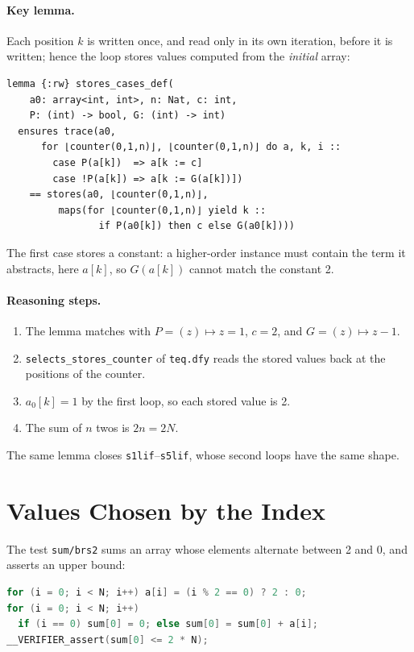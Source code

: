 \documentclass[sigconf,nonacm]{acmart}
\newcommand{\code}[1]{\texttt{#1}}
\begin{document}
\paragraph{Key lemma.} Each position $k$ is written once, and read only in
its own iteration, before it is written; hence the loop stores values computed
from the \emph{initial} array:
\begin{lstlisting}[language=dafny]
lemma {:rw} stores_cases_def(
    a0: array<int, int>, n: Nat, c: int,
    P: (int) -> bool, G: (int) -> int)
  ensures trace(a0,
      for ⌊counter(0,1,n)⌋, ⌊counter(0,1,n)⌋ do a, k, i ::
        case P(a[k])  => a[k := c]
        case !P(a[k]) => a[k := G(a[k])])
    == stores(a0, ⌊counter(0,1,n)⌋,
         maps(for ⌊counter(0,1,n)⌋ yield k ::
                if P(a0[k]) then c else G(a0[k])))
\end{lstlisting}
The first case stores a constant: a higher-order instance must contain the
term it abstracts, here $a[k]$, so $G(a[k])$ cannot match the constant 2.

\paragraph{Reasoning steps.}
\begin{enumerate}
\item The lemma matches with $P = (z) \mapsto z = 1$, $c = 2$, and
  $G = (z) \mapsto z - 1$.
\item \code{selects\_stores\_counter} of \code{teq.dfy} reads the stored
  values back at the positions of the counter.
\item $a_0[k] = 1$ by the first loop, so each stored value is 2.
\item The sum of $n$ twos is $2n = 2N$.
\end{enumerate}
The same lemma closes \code{s1lif}--\code{s5lif}, whose second loops have the
same shape.

\section{Values Chosen by the Index}

The test \code{sum/brs2} sums an array whose elements alternate between 2 and
0, and asserts an upper bound:
\begin{lstlisting}[language=C]
for (i = 0; i < N; i++) a[i] = (i % 2 == 0) ? 2 : 0;
for (i = 0; i < N; i++)
  if (i == 0) sum[0] = 0; else sum[0] = sum[0] + a[i];
__VERIFIER_assert(sum[0] <= 2 * N);
\end{lstlisting}
\end{document}
